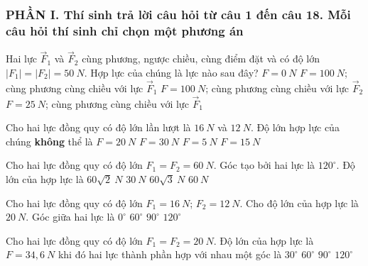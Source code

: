 \subsubsection*{PHẦN I. Thí sinh trả lời câu hỏi từ câu 1 đến câu 18. Mỗi câu hỏi thí sinh chỉ chọn một phương án}
\setcounter{ex}{0}
\begin{ex}%
Hai lực $\vec F_1$ và $\vec F_2$ cùng phương, ngược chiều, cùng điểm đặt và có độ lớn $|F_1| = |F_2| = 50\ N$. Hợp lực của chúng là lực nào sau đây?
\choice
{\True $F = 0\ N$}
{$F = 100\ N$; cùng phương cùng chiều với lực $\vec F_1$}
{$F = 100\ N$; cùng phương cùng chiều với lực $\vec F_2$}
{$F = 25\ N$; cùng phương cùng chiều với lực $\vec F_1$}
 \end{ex}
\begin{ex}
Cho hai lực đồng quy có độ lớn lần lượt là $16\ N$ và $12\ N$. Độ lớn hợp lực của chúng \textbf{không} thể là
\choice
{$F=20\ N$}
{\True $F=30\ N$}
{$F=5\ N$}
{$F=15\ N$}
\loigiai{}
\end{ex}
\begin{ex}%
Cho hai lực đồng quy có độ lớn $F_1 = F_2 = 60\ N$. Góc tạo bởi hai lực là $120^\circ$. Độ lớn của hợp lực là
\choice
{$60\sqrt2\ N$}
{$30\ N$}
{$60\sqrt3\ N$}
{\True $60\ N$}
 \end{ex}
\begin{ex}%
Cho hai lực đồng quy có độ lớn $F_1=16\ N$; $F_2=12\ N$. Cho độ lớn của hợp lực là $20\ N$. Góc giữa hai lực là
\choice
{$0^\circ$}
{$60^\circ$}
{\True $90^\circ$}
{$120^\circ$}
 \end{ex}
\begin{ex}%
Cho hai lực đồng quy có độ lớn $F_1=F_2=20\ N$. Độ lớn của hợp lực là $F=34,6\ N$ khi đó hai lực thành phần hợp với nhau một góc là
\choice
{$30^\circ $}
{\True $60^\circ $}
{$90^\circ $}
{$120^\circ $}

\end{ex}

